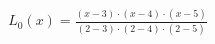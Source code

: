 \documentclass[preview]{standalone}
\begin{document}
\begin{align*}
L_0(x) = \frac{(x - 3) \cdot (x - 4) \cdot (x - 5)}{(2 - 3) \cdot (2 - 4) \cdot (2 - 5)}
\end{align*}
\end{document}
